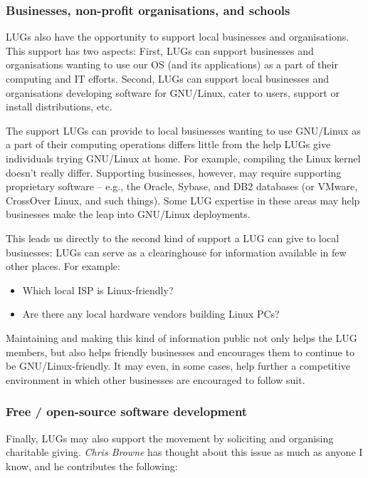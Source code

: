 \subsubsection{Businesses, non-profit organisations, and schools}

LUGs also have the opportunity to support local businesses and
organisations. This support has two aspects: First, LUGs can support
businesses and organisations wanting to use our OS (and its 
applications) as a part of their
computing and IT efforts. Second, LUGs can support local businesses
and organisations developing software for GNU/Linux, cater to users,
support or install distributions, etc.

The support LUGs can provide to local businesses wanting to use GNU/Linux as
a part of their computing operations differs little from the help LUGs
give individuals trying GNU/Linux at home. For example, compiling the Linux
kernel doesn't really differ. Supporting businesses, however, may
require supporting proprietary software -- e.g., the Oracle, Sybase,
and DB2 databases (or VMware, CrossOver Linux, and such things).   
Some LUG expertise in these areas may help businesses make the leap
into GNU/Linux deployments.

This leads us directly to the second kind of support a LUG can give to
local businesses: LUGs can serve as a clearinghouse for information
available in few other places. For example:

\begin{itemize}
\item Which local ISP is Linux-friendly?
\item Are there any local hardware vendors building Linux PCs?
\end{itemize}


Maintaining and making this kind of information public not only helps
the LUG members, but also helps friendly businesses and encourages
them to continue to be GNU/Linux-friendly. It may even, in some cases, help
further a competitive environment in which other businesses are
encouraged to follow suit.




\subsubsection{Free / open-source software development}

Finally, LUGs may also support the movement by soliciting and
organising charitable giving. 
\emph{Chris Browne} \texttt{\adgurl}
 has thought about this issue as much as
anyone I know, and he contributes the following:




